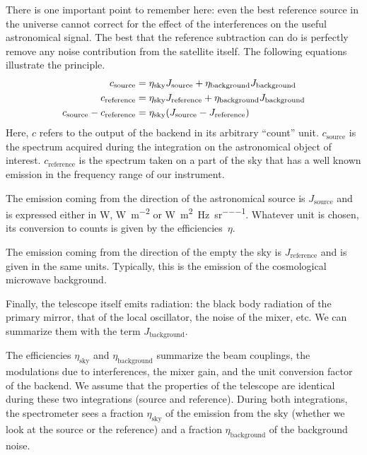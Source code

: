 There is one important point to remember here: even the best reference source in the universe cannot correct for the effect of the interferences on the useful astronomical signal.
The best that the reference subtraction can do is perfectly remove any noise contribution from the satellite itself.
The following equations illustrate the principle.
\begin{align}
    c_\text{source}
    &=
    \eta_\text{sky} J_\text{source}
    +
    \eta_\text{background} J_\text{background}
    \notag
    \\
    c_\text{reference}
    &=
    \eta_\text{sky} J_\text{reference}
    +
    \eta_\text{background} J_\text{background}
    \notag
    \\
    c_\text{source} - c_\text{reference}
    &=
    \eta_\text{sky} (J_\text{source} - J_\text{reference})
    \label{eq:remove_noise_only}
\end{align}
Here, $c$ refers to the output of the backend in its arbitrary ``count'' unit.
$c_\text{source}$ is the spectrum acquired during the integration on the astronomical object of interest.
$c_\text{reference}$ is the spectrum taken on a part of the sky that has a well known emission in the frequency range of our instrument.

The emission coming from the direction of the astronomical source is $J_\text{source}$ and is expressed either in \si{\watt}, \si{\watt\per\meter\squared} or \si{\watt\per\meter\squared\per\hertz\per\steradian}.
Whatever unit is chosen, its conversion to counts is given by the efficiencies~$\eta$.

The emission coming from the direction of the empty the sky is $J_\text{reference}$ and is given in the same units.
Typically, this is the emission of the cosmological microwave background.

Finally, the telescope itself emits radiation: the black body radiation of the primary mirror, that of the local oscillator, the noise of the mixer, etc.
We can summarize them with the term $J_\text{background}$.

The efficiencies $\eta_\text{sky}$ and $\eta_\text{background}$ summarize the beam couplings, the modulations due to interferences, the mixer gain, and the unit conversion factor of the backend.
We assume that the properties of the telescope are identical during these two integrations (source and reference).
During both integrations, the spectrometer sees a fraction $\eta_\text{sky}$ of the emission from the sky (whether we look at the source or the reference) and a fraction $\eta_\text{background}$ of the background noise.

